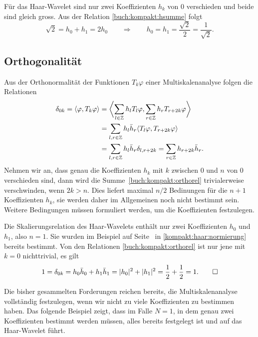 \begin{beispiel}
Für das Haar-Wavelet sind nur zwei Koeffizienten $h_k$ von $0$ verschieden
und beide sind gleich gross.
Aus der Relation \eqref{buch:kompakt:hsumme} folgt
\begin{equation}
\sqrt{2}
=
h_0+h_1
=2h_0
\qquad\Rightarrow\qquad
h_0 = h_1 = \frac{\sqrt{2}}{2}=\frac{1}{\sqrt{2}}.
\label{kompakt:haar:normierung}
\end{equation}
\qedhere
\end{beispiel}

\subsection{Orthogonalität}
Aus der Orthonormalität der Funktionen $T_k\varphi$ einer Multiskalenanalyse
folgen die Relationen
\begin{align}
\delta_{0k}
=
\langle \varphi,T_k \varphi\rangle
&=
\biggl\langle
\sum_{l\in\mathbb Z} h_lT_l\varphi,
\sum_{r\in\mathbb Z} h_rT_{r+2k}\varphi
\biggr\rangle
\notag
\\
&=
\sum_{l,r\in\mathbb Z} h_l\bar{h}_r \langle T_l\varphi, T_{r+2k}\varphi\rangle
\\
&=
\sum_{l,r\in\mathbb Z} h_l\bar{h}_r \delta_{l,r+2k}
=
\sum_{r\in\mathbb Z} h_{r+2k}\bar{h}_r.
\label{buch:kompakt:orthorel}
\end{align}
Nehmen wir an, dass genau die Koeffizienten $h_k$ mit $k$ zwischen
$0$ und $n$ von $0$ verschieden sind,
dann wird die Summe~\eqref{buch:kompakt:orthorel} trivialerweise
verschwinden, wenn $2k>n$.
Dies liefert maximal $n/2$ Bedinungen für die $n+1$ Koeffizienten
$h_k$, sie werden daher im Allgemeinen noch nicht bestimmt sein.
Weitere Bedingungen müssen formuliert werden, um die Koeffizienten
festzulegen.

\begin{beispiel}
Die Skalierungsrelation des Haar-Wavelets enthält nur zwei Koeffizienten
$h_0$ und $h_1$, also $n=1$.
Sie wurden im Beispiel auf Seite~\pageref{kompakt:haar:normierung}
in \eqref{kompakt:haar:normierung} bereits bestimmt.
Von den Relationen \eqref{buch:kompakt:orthorel} ist nur jene mit $k=0$
nichttrivial, es gilt
\[
1
=
\delta_{0k}
=
h_0\bar{h}_0 + h_1\bar{h}_1
=
|h_0|^2+|h_1|^2
=
\frac12+\frac12
=1.
\qedhere
\]
\end{beispiel}

Die bisher gesammelten Forderungen reichen bereits, die Multiskalenanalyse
vollständig festzulegen, wenn wir nicht zu viele Koeffizienten zu
bestimmen haben.
Das folgende Beispiel zeigt, dass im Falle $N=1$, in dem genau zwei 
Koeffizienten bestimmt werden müssen, alles bereits festgelegt ist
und auf das Haar-Wavelet führt.

